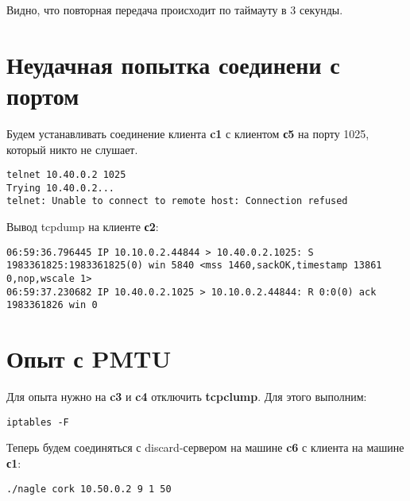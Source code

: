 \documentclass[a4paper,12pt]{article}
\begin{document}
Видно, что повторная передача происходит по таймауту в 3 секунды.

\section{Неудачная попытка соединени с портом}

Будем устанавливать соединение клиента \textbf{c1} с клиентом \textbf{с5} на порту 1025,
который никто не слушает.
\begin{Verbatim}
telnet 10.40.0.2 1025
Trying 10.40.0.2...
telnet: Unable to connect to remote host: Connection refused
\end{Verbatim}

Вывод tcpdump на клиенте \textbf{с2}:
\begin{Verbatim}
06:59:36.796445 IP 10.10.0.2.44844 > 10.40.0.2.1025: S 1983361825:1983361825(0) win 5840 <mss 1460,sackOK,timestamp 13861 0,nop,wscale 1>
06:59:37.230682 IP 10.40.0.2.1025 > 10.10.0.2.44844: R 0:0(0) ack 1983361826 win 0
\end{Verbatim}

\section{Опыт с PMTU}

Для опыта нужно на \textbf{c3} и \textbf{c4} отключить \textbf{tcpclump}. Для этого
выполним:
\begin{Verbatim}
iptables -F
\end{Verbatim}

Теперь будем соединяться с discard-сервером на машине \textbf{c6} с клиента на машине
\textbf{с1}:
\begin{Verbatim}
./nagle cork 10.50.0.2 9 1 50
\end{Verbatim}
\end{document}
